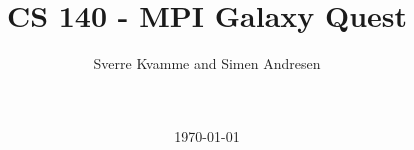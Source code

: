 \newcommand{\figurepath}{./figures/}
\newcommand{\figurescale}{0.65}
\newcommand{\codepath}{../matlab/}




\title{ CS 140 - MPI Galaxy Quest}
\author{Sverre Kvamme and Simen Andresen}
\date{\ \\ \ \\ \today}




\maketitle


\pagestyle{fancy}
\lhead{}
\rhead{\thepage}
\setcounter{page}{1}

\rhead{\thepage}
\cfoot{}


%



